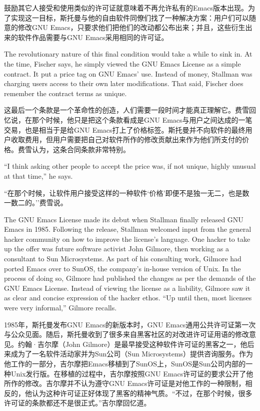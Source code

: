 \ifdefined\chs
鼓励其它人接受和使用类似的许可证就意味着不再允许私有的Emacs版本出现。为了实现这一目标，斯托曼与他的自由软件同僚们找了一种解决方案：用户们可以随意的修改GNU Emacs，只要求他们把他们的改动都公布出来；并且，这些衍生出来的软件作品需要与GNU Emacs采用相同的许可证。
\fi

\ifdefined\eng
The revolutionary nature of this final condition would take a while to sink in. At the time, Fischer says, he simply viewed the GNU Emacs License as a simple contract. It put a price tag on GNU Emacs' use. Instead of money, Stallman was charging users access to their own later modifications. That said, Fischer does remember the contract terms as unique.
\fi

\ifdefined\chs
这最后一个条款是一个革命性的创造，人们需要一段时间才能真正理解它。费雪回忆说，在那个时候，他只是把这个条款看成是GNU Emacs与用户之间达成的一笔交易，也是相当于是给GNU Emacs打上了价格标签。斯托曼并不向软件的最终用户收取费用，但用户需要把自己对软件所作的修改贡献出来作为他们所支付的价格。费雪认为，这条合同条款非常特别。
\fi

\ifdefined\eng
``I think asking other people to accept the price was, if not unique, highly unusual at that time,'' he says.
\fi

\ifdefined\chs
``在那个时候，让软件用户接受这样的一种软件`价格'即便不是独一无二，也是数一数二的。''费雪说。
\fi

\ifdefined\eng
The GNU Emacs License made its debut when Stallman finally released GNU Emacs in 1985. Following the release, Stallman welcomed input from the general hacker community on how to improve the license's language. One hacker to take up the offer was future software activist John Gilmore, then working as a consultant to Sun Microsystems. As part of his consulting work, Gilmore had ported Emacs over to SunOS, the company's in-house version of Unix. In the process of doing so, Gilmore had published the changes as per the demands of the GNU Emacs License. Instead of viewing the license as a liability, Gilmore saw it as clear and concise expression of the hacker ethos. ``Up until then, most licenses were very informal,'' Gilmore recalls.
\fi

\ifdefined\chs
1985年，斯托曼发布GNU Emacs的新版本时，GNU Emacs通用公共许可证第一次与公众见面。随后，斯托曼收到了很多来自黑客社区的对改进许可证用语的修改意见。约翰·吉尔摩（John Gilmore）是最早接受这种软件许可证的黑客之一，他后来成为了一名软件活动家并为Sun公司（Sun Microsystems）提供咨询服务。作为他工作的一部分，吉尔摩把Emacs移植到了SunOS上，SunOS是Sun公司内部的一种Unix发行版。在移植的过程中，吉尔摩按照GNU Emacs许可证的要求公开了他所作的修改。吉尔摩并不认为遵守GNU Emacs许可证是对他工作的一种限制，相反的，他认为这种许可证正好体现了黑客的精神气质。``不过，在那个时候，很多许可证的条款都还不是很正式。''吉尔摩回忆道。
\fi

